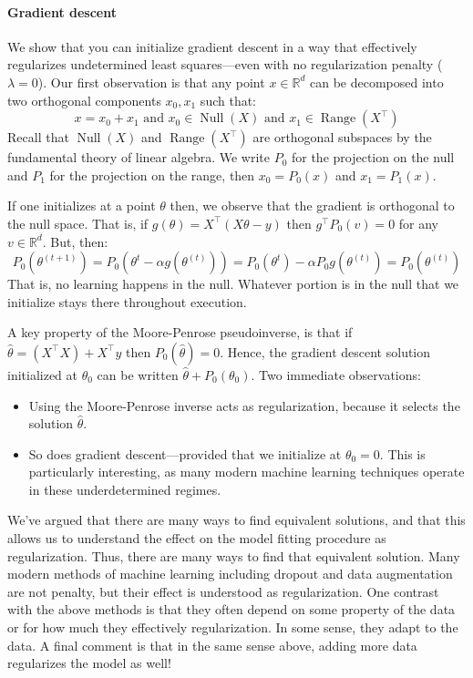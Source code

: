 \paragraph{Gradient descent} We show that you can initialize gradient descent in a way
that effectively regularizes undetermined least squares---even with no
regularization penalty ($\lambda = 0$). Our first observation is that any point $x \in \mathbb R^d$ can be
decomposed into two orthogonal components $x_0 ,x_1$ such that:
\begin{equation}
    x = x_0 + x_1 \text{ and } x_0 \in \operatorname{Null}(X) \text{ and } x_1 \in \operatorname{Range}(X^\top)    
\end{equation}
Recall that $\operatorname{Null}(X)$ and $\operatorname{Range}(X^\top)$ are orthogonal subspaces by the
fundamental theory of linear algebra. We write $P_0$ for the projection on the null and $P_1$
for the projection on the range, then $x_0 = P_0 (x)$ and $x_1 = P_1 (x)$.

If one initializes at a point $\theta$ then, we observe that the gradient is orthogonal
to the null space. That is, if $g(\theta) = X^\top (X\theta-y)$ then $g^\top P_0 (v) = 0$ for any $v \in \mathbb R^d$.
But, then:
\begin{equation}
    P_0 (\theta^{(t+1)}) = P_0 (\theta^t - \alpha g(\theta^{(t)})) = P_0 (\theta^t) - \alpha P_0 g(\theta^{(t)}) = P_0 (\theta^{(t)})
\end{equation}
That is, no learning happens in the null. Whatever portion is in the null that
we initialize stays there throughout execution.

A key property of the Moore-Penrose pseudoinverse, is that if $\hat{\theta} = (X^\top X) + X^\top y$
then $P_0(\hat{\theta}) = 0$. Hence, the gradient descent solution initialized at $\theta_0$ can be
written $\hat{\theta} + P_0 (\theta_0 )$. Two immediate observations:
\begin{itemize}
    \item Using the Moore-Penrose inverse acts as regularization, because it selects
    the solution $\hat{\theta}$.
    \item So does gradient descent---provided that we initialize at $\theta_0 = 0$. This
    is particularly interesting, as many modern machine learning techniques
    operate in these underdetermined regimes.
\end{itemize}

We've argued that there are many ways to find equivalent solutions, and that
this allows us to understand the effect on the model fitting procedure as
regularization. Thus, there are many ways to find that equivalent solution. Many
modern methods of machine learning including dropout and data augmentation
are not penalty, but their effect is understood as regularization. One contrast
with the above methods is that they often depend on some property of the data
or for how much they effectively regularization. In some sense, they adapt to
the data. A final comment is that in the same sense above, adding more data
regularizes the model as well!



